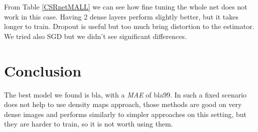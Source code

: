 \documentclass[10pt,twocolumn,letterpaper]{article}
\begin{document}
From Table \ref{CSRnetMALL} we can see how fine tuning the whole net does not work in this case.
Having 2 dense layers perform slightly better, but it takes longer to train. Dropout is useful but too much bring distortion to the estimator.
We tried also SGD but we didn't see significant differences. 

\section{Conclusion}
The best model we found is bla, with a \textit{MAE} of bla99. In such a fixed scenario does not help to use density maps approach, those methods are good on very dense images and performs similarly to simpler approaches on this setting, but they are harder to train, so it is not worth using them.

\printbibliography

%
%
\end{document}
